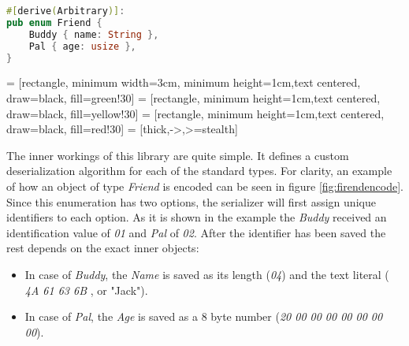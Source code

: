 \begin{minipage}{\linewidth}
\begin{lstlisting}[language=Rust,caption={Example of \textit{Arbitrary} crate usage.},label={lst:arb_crate}]
#[derive(Arbitrary)]:
pub enum Friend {
    Buddy { name: String },
    Pal { age: usize },
} 
\end{lstlisting} 
\end{minipage}

 = [rectangle, minimum width=3cm, minimum height=1cm,text centered, draw=black, fill=green!30]
 = [rectangle, minimum height=1cm,text centered, draw=black, fill=yellow!30]
 = [rectangle, minimum height=1cm,text centered, draw=black, fill=red!30]
 = [thick,->,>=stealth]

The inner workings of this library are quite simple. It defines a custom deserialization algorithm for each of the standard types. For clarity, an example of how an object of type \textit{Friend} is encoded can be seen in figure \ref{fig:firendencode}. Since this enumeration has two options, the serializer will first assign unique identifiers to each option. As it is shown in the example the \textit{Buddy} received an identification value of \textit{01} and \textit{Pal} of \textit{02}. After the identifier has been saved the rest depends on the exact inner objects:
\begin{itemize}
    \item In case of \textit{Buddy}, the \textit{Name} is saved as its length (\textit{04}) and the text literal (\textit{ 4A 61 63 6B }, or "Jack").
    \item In case of \textit{Pal}, the \textit{Age} is saved as a 8 byte number (\textit{20 00 00 00 00 00 00 00}).
\end{itemize}

